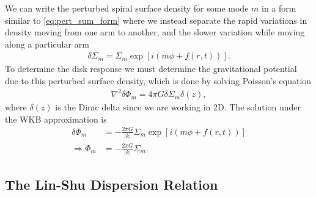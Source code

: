 We can write the perturbed spiral surface density for some mode $m$ in a form similar to \ref{eq:pert_sum_form} where we instead separate the rapid variations in density moving from one arm to another, and the slower variation while moving along a particular arm
\begin{align}
    \delta \Sigma_m = \Sigma_m \exp \left[ i \left( m \phi + f(r,t)  \right)  \right]. \label{eq:sigma_WKB}
\end{align}
To determine the disk response we must determine the gravitational potential due to this perturbed surface density, which is done by solving Poisson's equation
\begin{align}
    \nabla^2 \delta \Phi_m = 4 \pi G \delta \Sigma_m \delta(z), \label{eq:poisson_pert}
\end{align}
where $\delta(z)$ is the Dirac delta since we are working in 2D. 
The solution under the WKB approximation is \fct
\begin{align}
    \delta \Phi_m &= - \frac{2 \pi G}{|k|} \Sigma_m \exp \left[ i \left( m \phi + f(r,t)  \right)  \right] \\
    \Rightarrow \Phi_m &= - \frac{2 \pi G}{|k|} \Sigma_m. \label{eq:phi_m_sigma_m}
\end{align}

\subsection{The Lin-Shu Dispersion Relation} \label{sec:linshu}

